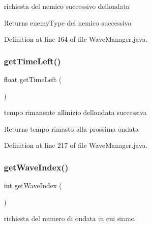 richiesta del nemico successivo dell\textquotesingle{}ondata 

\begin{DoxyReturn}{Returns}
enemy\+Type del nemico successivo 
\end{DoxyReturn}


Definition at line 164 of file Wave\+Manager.\+java.

\mbox{\label{classmanagers_1_1_wave_manager_a708aedb9bcf9177c5064192552091f66}} 
\subsubsection{\texorpdfstring{get\+Time\+Left()}{getTimeLeft()}}
{\footnotesize\ttfamily float get\+Time\+Left (\begin{DoxyParamCaption}{ }\end{DoxyParamCaption})}



tempo rimanente all\textquotesingle{}inizio dell\textquotesingle{}ondata successiva 

\begin{DoxyReturn}{Returns}
tempo rimasto alla prossima ondata 
\end{DoxyReturn}


Definition at line 217 of file Wave\+Manager.\+java.

\mbox{\label{classmanagers_1_1_wave_manager_a60286ee915faec2babdb0242b29fd90b}} 
\subsubsection{\texorpdfstring{get\+Wave\+Index()}{getWaveIndex()}}
{\footnotesize\ttfamily int get\+Wave\+Index (\begin{DoxyParamCaption}{ }\end{DoxyParamCaption})}



richiesta del numero di ondata in cui siamo 

